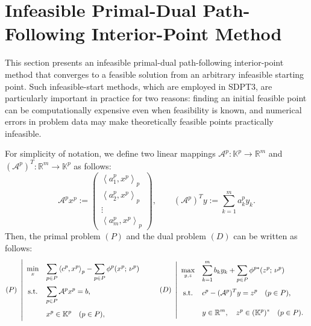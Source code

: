 \section{Infeasible Primal-Dual Path-Following Interior-Point Method}
\label{sec:infeasible_IPM}
This section presents an infeasible primal-dual path-following interior-point method that converges to a feasible solution from an arbitrary infeasible starting point.
Such infeasible-start methods, which are employed in SDPT3, are particularly important in practice for two reasons: finding an initial feasible point can be computationally expensive even when feasibility is known, and numerical errors in problem data may make theoretically feasible points practically infeasible.

For simplicity of notation, we define two linear mappings 
$\mathcal{A}^p : \mathbb{K}^p \to \mathbb{R}^m$ and 
$(\mathcal{A}^p)^T : \mathbb{R}^m \to \mathbb{K}^p$ 
as follows:
\[
  \mathcal{A}^p x^p
  := 
  \begin{pmatrix}
      \left\langle a^p_1, x^p \right\rangle_p \\
      \left\langle a^p_2, x^p \right\rangle_p \\
      \vdots \\
      \left\langle a^p_m, x^p \right\rangle_p
  \end{pmatrix},
  \qquad
  (\mathcal{A}^p)^T y
  :=
  \sum_{k=1}^m a^p_k y_k.
\]
Then, the primal problem $(P)$ and the dual problem $(D)$ can be written as follows:
\[
  \everymath{\displaystyle}
  \renewcommand{\arraystretch}{2.0}
  (P)~
  \left|
  \begin{array}{cl}
      \min_{x} & \displaystyle
       \sum_{p \in P} \left\langle c^p, x^p \right\rangle_p - \sum_{p \in P} \phi^p(x^p;\, \nu^p) \\[3pt]
      \text{s.t.} & \displaystyle
       \sum_{p \in P} \mathcal{A}^p x^p = b,\\[3pt]
      & x^p \in \mathbb{K}^p \quad (p \in P),
  \end{array}
  \right.
  \qquad
  (D)~
  \left|
  \begin{array}{cl}
      \max_{y,z} & \displaystyle
       \sum_{k=1}^m b_k y_k 
          + \sum_{p \in P} \phi^{p*}(z^p;\, \nu^p) \\[3pt]
      \text{s.t.} & \displaystyle
       c^p - (\mathcal{A}^p)^T y = z^p \quad (p \in P),\\[3pt]
      & y \in \mathbb{R}^m, \quad z^p \in (\mathbb{K}^p)^* \quad (p \in P).
  \end{array}
  \right.
\]

